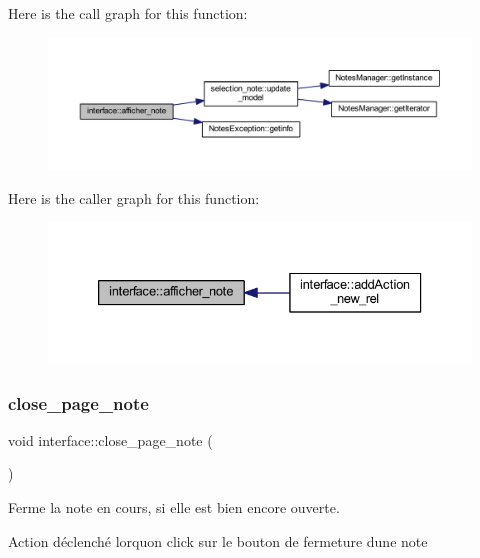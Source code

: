 Here is the call graph for this function\+:\nopagebreak
\begin{figure}[H]
\begin{center}
\leavevmode
\includegraphics[width=350pt]{classinterface_a320051a7a36aa24f53b12df82649f15f_cgraph}
\end{center}
\end{figure}
Here is the caller graph for this function\+:\nopagebreak
\begin{figure}[H]
\begin{center}
\leavevmode
\includegraphics[width=333pt]{classinterface_a320051a7a36aa24f53b12df82649f15f_icgraph}
\end{center}
\end{figure}
\mbox{\label{classinterface_abe2464522932a5d8ed76d1ba02c9d2c6}} 
\subsubsection{\texorpdfstring{close\+\_\+page\+\_\+note}{close\_page\_note}}
{\footnotesize\ttfamily void interface\+::close\+\_\+page\+\_\+note (\begin{DoxyParamCaption}{ }\end{DoxyParamCaption})\hspace{0.3cm}{\ttfamily [slot]}}



Ferme la note en cours, si elle est bien encore ouverte. 

Action déclenché lorqu\textquotesingle{}on click sur le bouton de fermeture d\textquotesingle{}une note 

